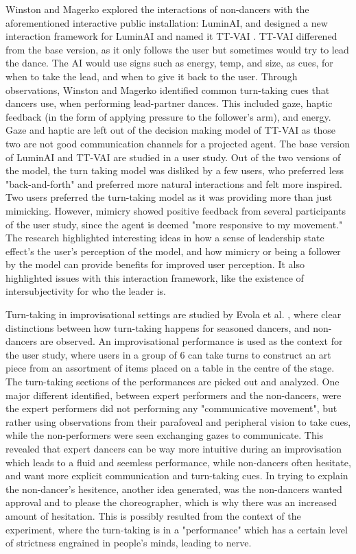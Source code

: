 \documentclass[final,5p,times,twocolumn,authoryear]{article}
\begin{document}
Winston and Magerko explored the interactions of non-dancers with the
aforementioned interactive public installation: LuminAI, and designed a
new interaction framework for LuminAI and named it TT-VAI
\cite{Winston2017}. TT-VAI differened from the base version, as it only follows the user
but sometimes would try to lead the dance. 
The AI would use signs such as energy, temp, and size,
as cues, for when to take the lead, and when to give it back to the
user. Through observations, Winston and Magerko identified common
turn-taking cues that dancers use, when performing lead-partner dances.
This included gaze, haptic feedback (in the form of applying
pressure to the
follower's arm), and energy. Gaze and haptic are left out of the
decision making model of TT-VAI as those two are not good communication
channels for a projected agent. The base version of LuminAI and TT-VAI are
studied in a user study. Out of the two versions of the
model, the turn taking model was disliked by a few users, who preferred
less "back-and-forth" and preferred more natural interactions and felt
more inspired. Two users preferred the turn-taking model as it was providing
more than just mimicking. However, mimicry showed positive
feedback from several participants of the user study, since the agent is
deemed "more responsive to my movement." The research highlighted
interesting ideas in how a sense of leadership state effect's the user's
perception of the model, and how mimicry or being a follower by the
model can provide benefits for improved user perception. It also
highlighted issues with this interaction framework, like the existence of intersubjectivity
for who the leader is.

Turn-taking in improvisational settings are studied by Evola et al.
\cite{Evola}, where clear distinctions between how turn-taking happens
for seasoned dancers, and non-dancers are observed.  An improvisational
performance is used as the context for the user study, where users in a
group of 6 can take turns to construct an art piece from an assortment
of items placed on a table in the centre of the stage. The turn-taking
sections of the performances are picked out and analyzed.  One major
different identified, between expert performers and the non-dancers,
were the expert performers did not performing any "communicative
movement", but rather using observations from their parafoveal and
peripheral vision to take cues, while the non-performers were seen
exchanging gazes to communicate. This revealed that expert dancers can
be way more intuitive during an improvisation which leads to a fluid and
seemless performance, while non-dancers often hesitate, and want more
explicit communication and turn-taking cues. In trying to explain the
non-dancer's hesitence, another idea generated, was the non-dancers
wanted approval and to please the choreographer, which is why there was
an increased amount of hesitation. This is possibly resulted from the
context of the experiment, where the turn-taking is in a "performance"
which has a certain level of strictness engrained in people's minds,
leading to nerve.
\end{document}
